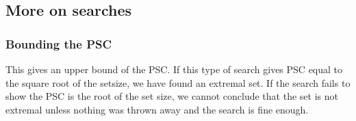 \documentclass[letter,11pt]{amsart}
\numberwithin{theorem}{section}
\theoremstyle{remark}
\numberwithin{equation}{section}
\begin{document}

 \subsection{More on searches}
 
 \subsubsection*{Bounding the PSC} This gives an upper bound of the PSC. 
 If this type of search gives PSC equal to the square root
 of the setsize, we have found an extremal set. If the search fails to show the
 PSC is the root of the set  size, we  cannot conclude  that the
 set is not extremal unless nothing was thrown away and the search is fine enough.
 
\end{document}
